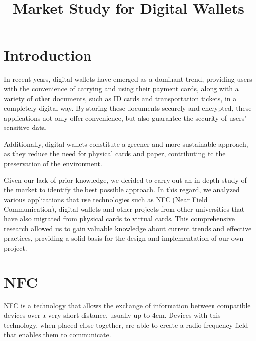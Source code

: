 \documentclass{article}
\begin{document}
\title{Market Study for Digital Wallets}
\maketitle

\section{Introduction}

In recent years, digital wallets have emerged as a dominant trend, providing users with the convenience of carrying and using their payment cards, along with a variety of other documents, such as ID cards and transportation tickets, in a completely digital way. By storing these documents securely and encrypted, these applications not only offer convenience, but also guarantee the security of users' sensitive data.

Additionally, digital wallets constitute a greener and more sustainable approach, as they reduce the need for physical cards and paper, contributing to the preservation of the environment.

Given our lack of prior knowledge, we decided to carry out an in-depth study of the market to identify the best possible approach. In this regard, we analyzed various applications that use technologies such as NFC (Near Field Communication), digital wallets and other projects from other universities that have also migrated from physical cards to virtual cards. This comprehensive research allowed us to gain valuable knowledge about current trends and effective practices, providing a solid basis for the design and implementation of our own project.

\section{NFC}

NFC is a technology that allows the exchange of information between compatible devices over a very short distance, usually up to 4cm. Devices with this technology, when placed close together, are able to create a radio frequency field that enables them to communicate.
\end{document}
